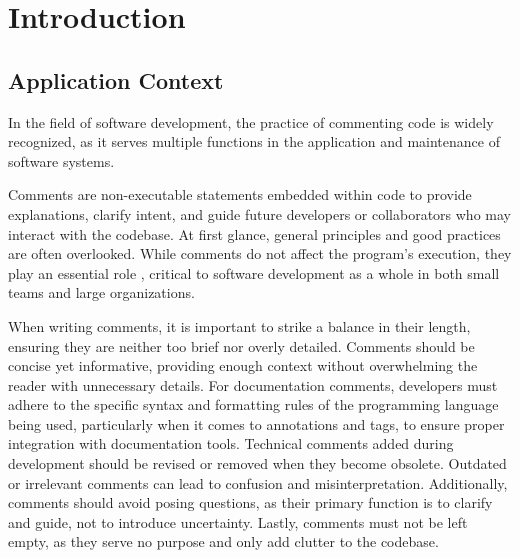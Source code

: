 
\chapter{Introduction} %

\label{Chapter1} %


\newcommand{\keyword}[1]{\textbf{#1}}
\newcommand{\tabhead}[1]{\textbf{#1}}
\newcommand{\code}[1]{\texttt{#1}}
\newcommand{\file}[1]{\texttt{\bfseries#1}}
\newcommand{\option}[1]{\texttt{\itshape#1}}


\section{Application Context} In the field of software development, the practice of commenting code is widely recognized, as it serves multiple functions in the application and maintenance of software systems.

\noindent Comments are non-executable statements embedded within code to provide explanations, clarify intent, and guide future developers or collaborators who may interact with the codebase. At first glance, general principles and good practices \cite{commentingPrinciples} are often overlooked.
While comments do not affect the program’s execution, they play an essential role \cite{codeReadability}  \cite{codeMaintainability}, critical to software development as a whole in both small teams and large organizations.

\noindent When writing comments, it is important to strike a balance in their length, ensuring they are neither too brief nor overly detailed. Comments should be concise yet informative, providing enough context without overwhelming the reader with unnecessary details.
For documentation comments, developers must adhere to the specific syntax and formatting rules of the programming language being used, particularly when it comes to annotations and tags, to ensure proper integration with documentation tools.
Technical comments added during development should be revised or removed when they become obsolete. Outdated or irrelevant comments can lead to confusion and misinterpretation.
Additionally, comments should avoid posing questions, as their primary function is to clarify and guide, not to introduce uncertainty. Lastly, comments must not be left empty, as they serve no purpose and only add clutter to the codebase.

